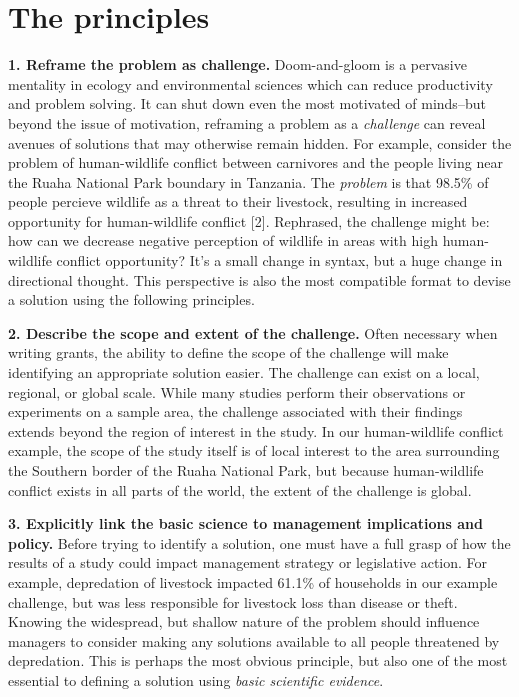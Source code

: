 \documentclass[10pt,letterpaper]{article}
\begin{document}
\section{The principles}\label{the-principles}

\textbf{1. Reframe the problem as challenge.} Doom-and-gloom is a
pervasive mentality in ecology and environmental sciences which can
reduce productivity and problem solving. It can shut down even the most
motivated of minds--but beyond the issue of motivation, reframing a
problem as a \emph{challenge} can reveal avenues of solutions that may
otherwise remain hidden. For example, consider the problem of
human-wildlife conflict between carnivores and the people living near
the Ruaha National Park boundary in Tanzania. The \emph{problem} is that
98.5\% of people percieve wildlife as a threat to their livestock,
resulting in increased opportunity for human-wildlife conflict {[}2{]}.
Rephrased, the challenge might be: how can we decrease negative
perception of wildlife in areas with high human-wildlife conflict
opportunity? It's a small change in syntax, but a huge change in
directional thought. This perspective is also the most compatible format
to devise a solution using the following principles.

\textbf{2. Describe the scope and extent of the challenge.} Often
necessary when writing grants, the ability to define the scope of the
challenge will make identifying an appropriate solution easier. The
challenge can exist on a local, regional, or global scale. While many
studies perform their observations or experiments on a sample area, the
challenge associated with their findings extends beyond the region of
interest in the study. In our human-wildlife conflict example, the scope
of the study itself is of local interest to the area surrounding the
Southern border of the Ruaha National Park, but because human-wildlife
conflict exists in all parts of the world, the extent of the challenge
is global.

\textbf{3. Explicitly link the basic science to management implications
and policy.} Before trying to identify a solution, one must have a full
grasp of how the results of a study could impact management strategy or
legislative action. For example, depredation of livestock impacted
61.1\% of households in our example challenge, but was less responsible
for livestock loss than disease or theft. Knowing the widespread, but
shallow nature of the problem should influence managers to consider
making any solutions available to all people threatened by depredation.
This is perhaps the most obvious principle, but also one of the most
essential to defining a solution using \emph{basic scientific evidence}.
\end{document}
